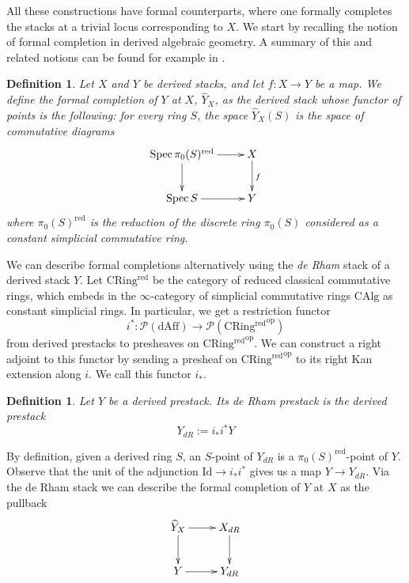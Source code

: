 \documentclass[11pt,letterpaper]{amsart}
\newtheorem{definition}[dummy]{Definition}
\newcommand{\cP}{\mathcal{P}}
\newcommand{\op}{\mathrm{op}}
\newcommand{\dAff}{\mathrm{dAff}}
\newcommand{\Spec}{\mathrm{S}\mathrm{pec}\,}
\newcommand{\CAlg}{\mathrm{CAlg}}
\newcommand{\Id}{\mathrm{Id}}
\begin{document}
All these constructions have formal counterparts, where one formally completes the stacks at a trivial locus corresponding to $X$. We start by  recalling the notion of formal completion in derived algebraic geometry. A summary of this and related notions can be found for example in \cite{HChen}.
\begin{definition}
Let $X$ and $Y$ be derived stacks, and let $f:X\rightarrow Y$ be a map. We define the \emph{formal completion} of $Y$ at $X$, $\widehat{Y}_X$, as the derived stack whose functor of points is the following: for every ring $S$, the space $\widehat{Y}_X(S)$ is the space of commutative diagrams
$$
\xymatrix{
\Spec \pi_0(S)^\mathrm{red}\ar[r]\ar[d] & X\ar[d]^{f} \\
\Spec S\ar[r] &Y
}
$$
where $\pi_0(S)^{\mathrm{red}}$ is the reduction of the discrete ring $\pi_0(S)$ considered as a constant simplicial commutative ring.
\end{definition}
We can describe formal completions alternatively using the \emph{de Rham} stack of a derived stack $Y$. Let $\mathrm{CRing^{\mathrm{red}}}$ be the category of reduced classical commutative rings, which embeds in the $\infty$-category of simplicial commutative rings $\CAlg$ as constant simplicial rings. 
In particular, we get a restriction functor
\begin{equation*}
i^\ast:\cP(\dAff)\rightarrow\cP(\mathrm{CRing^{\mathrm{red}}}^\op)
\end{equation*}
from derived prestacks to presheaves on $\mathrm{CRing^{\mathrm{red}}}^\op$. We can construct a right adjoint to this functor by sending a presheaf on $\mathrm{CRing^{\mathrm{red}}}^\op$ to its right Kan extension along $i$. We call this functor $i_\ast$. 
\begin{definition}
Let $Y$ be a derived prestack. Its \emph{de Rham} prestack is the derived prestack 
$$Y_{dR}:=i_\ast i^\ast Y$$
\end{definition}
By definition, given a derived ring $S$, an $S$-point of $Y_{dR}$ is a $\pi_0(S)^\mathrm{red}$-point of $Y$. 
Observe that the unit of the adjunction $\Id\rightarrow i_\ast i^\ast$ gives us a  map $Y\rightarrow Y_{dR}$. 
Via the de Rham stack we can describe the formal completion of $Y$ at $X$ as the pullback 
$$
\xymatrix{
\widehat{Y}_X\ar[r]\ar[d] & X_{dR}\ar[d]\\
Y\ar[r] & Y_{dR}
}
$$
\end{document}
